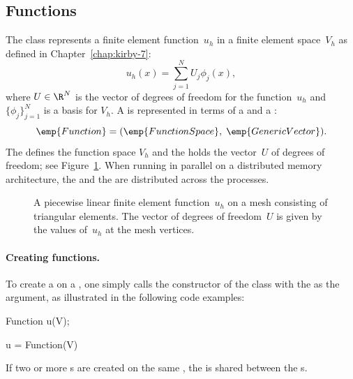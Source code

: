 \subsection{Functions}

The  class represents a finite element
function~$u_h$ in a finite element space~$V_h$ as defined in
Chapter~\ref{chap:kirby-7}:
\begin{equation}
  u_h(x) = \sum_{j=1}^N U_j \phi_j(x),
\end{equation}
where $U \in \R^N$ is the vector of degrees of freedom for the
function~$u_h$ and $\{\phi_j\}_{j=1}^N$ is a basis for $V_h$.  A
 is represented in terms of a  and a
:
\begin{equation*}
  \emp{Function} = (\emp{FunctionSpace},\; \emp{GenericVector}).
\end{equation*}
The  defines the function space $V_h$ and the
 holds the vector~$U$ of degrees of freedom; see
Figure~\ref{fig:logg-2:femsolution}. When running in parallel on a
distributed memory architecture, the  and the
 are distributed across the processes.

\begin{figure}
  \center{}
  \caption{A piecewise linear finite element function~$u_h$ on a
    mesh consisting of triangular elements. The vector of degrees of
    freedom~$U$ is given by the values of~$u_h$ at the mesh
    vertices.}
  \label{fig:logg-2:femsolution}
\end{figure}

\paragraph{Creating functions.}

To create a  on a , one simply calls
the constructor of the  class with the 
as the argument, as illustrated in the following code examples:
\begin{c++}
Function u(V);
\end{c++}
\begin{python}
u = Function(V)
\end{python}
If two or more s are created on the same
, the  is shared between the
s.

